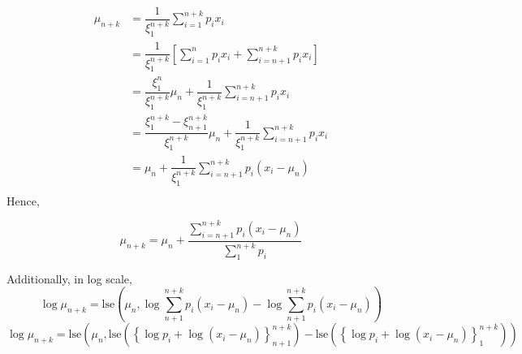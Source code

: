 \documentclass[a4paper, 11pt]{article}
\newcommand{\lse}[1]{\text{lse}\left( #1 \right)}
\begin{document}
\begin{align*}
  \mu_{n + k}
  &=
    \dfrac{1}{\xi_1^{n+k}} \sum_{i = 1}^{n+k} p_i x_i \\
  &=
    \dfrac{1}{\xi_{1}^{n+k}}
    \left[
    \sum_{i = 1}^{n} p_i x_i +
    \sum_{i = n+1}^{n+k} p_i x_i
    \right] \\
  &= \dfrac{\xi_{1}^{n}}{\xi_{1}^{n+k}}
    \mu_n +
    \dfrac{1}{\xi_{1}^{n+k}}
    \sum_{i = n+1}^{n+k} p_i x_i \\
  &= \dfrac{\xi_{1}^{n+k} - \xi_{n+1}^{n+k}}{\xi_{1}^{n+k}}
    \mu_n +
    \dfrac{1}{\xi_{1}^{n+k}}
    \sum_{i = n+1}^{n+k} p_i x_i \\
  &= \mu_n +
    \dfrac{1}{\xi_{1}^{n+k}}
    \sum_{i = n+1}^{n+k} p_i (x_i - \mu_n) \\
\end{align*}
Hence,
\begin{framed}
  \begin{displaymath}
    \mu_{n+k}= \mu_n +
    \dfrac{\sum_{i = n+1}^{n+k} p_i (x_i - \mu_n)}{\sum_{1}^{n+k}p_i}
  \end{displaymath}
\end{framed}
Additionally, in log scale,
\begin{displaymath}
  \log{\mu_{n+k}}= \lse{
    \mu_n,
    \log{\sum_{n+1}^{n+k} p_i(x_i - \mu_n)}
    - \log{\sum_{n+1}^{n+k} p_i(x_i - \mu_n)}
  }
\end{displaymath}
\begin{displaymath}
  \log{\mu_{n+k}}= \lse{
    \mu_n,
    \lse{\left\{\log{p_i} + \log{(x_i - \mu_n)} \right\}_{n+1}^{n+k} }
    - \lse{\left\{\log{p_i} + \log{(x_i - \mu_n)} \right\}_{1}^{n+k} }
  }
\end{displaymath}


\end{document}

